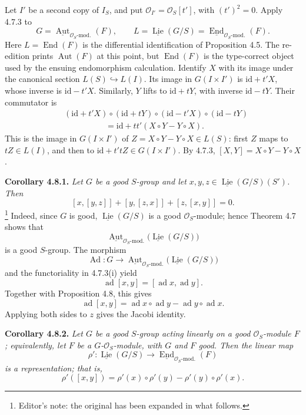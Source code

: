 Let \(I'\) be a second copy of \(I_S\), and put
\(\mathcal O_{I'}=\mathcal O_S[t']\), with \((t')^2=0\). Apply 4.7.3
to
\[
 G=\underline{\operatorname{Aut}}_{\mathcal O_S\text{-mod.}}(F),
 \qquad
 L=\underline{\operatorname{Lie}}(G/S)
  =\underline{\operatorname{End}}_{\mathcal O_S\text{-mod.}}(F).
\]
Here \(L=\operatorname{End}(F)\) is the differential identification of
Proposition 4.5. The re-edition prints \(\operatorname{Aut}(F)\) at
this point, but \(\operatorname{End}(F)\) is the type-correct object
used by the ensuing endomorphism calculation. Identify \(X\) with its image under the
canonical section \(L(S)\hookrightarrow L(I)\). Its image in
\(G(I\times I')\) is \(\mathrm{id}+t'X\), whose inverse is
\(\mathrm{id}-t'X\). Similarly, \(Y\) lifts to
\(\mathrm{id}+tY\), with inverse \(\mathrm{id}-tY\). Their
commutator is
\[
\begin{aligned}
 &(\mathrm{id}+t'X)\circ(\mathrm{id}+tY)
 \circ(\mathrm{id}-t'X)\circ(\mathrm{id}-tY)\\
 &\hspace{5em}
 =\mathrm{id}+tt'(X\circ Y-Y\circ X).
\end{aligned}
\]
This is the image in \(G(I\times I')\) of
\(Z=X\circ Y-Y\circ X\in L(S)\): first \(Z\) maps to
\(tZ\in L(I)\), and then to
\(\mathrm{id}+t'tZ\in G(I\times I')\). By 4.7.3,
\([X,Y]=X\circ Y-Y\circ X\).

\medskip
\noindent\textbf{Corollary 4.8.1.}
\textit{Let \(G\) be a good \(S\)-group and let
\(x,y,z\in\underline{\operatorname{Lie}}(G/S)(S')\). Then}
\[
 [x,[y,z]]+[y,[z,x]]+[z,[x,y]]=0.
\]
\footnote{Editor's note: the original has been expanded in what follows.}
Indeed, since \(G\) is good,
\(\underline{\operatorname{Lie}}(G/S)\) is a good
\(\mathcal O_S\)-module; hence Theorem 4.7 shows that
\[
 \underline{\operatorname{Aut}}_{\mathcal O_S\text{-mod.}}
   \bigl(\underline{\operatorname{Lie}}(G/S)\bigr)
\]
is a good \(S\)-group. The morphism
\[
 \operatorname{Ad}:G\longrightarrow
 \underline{\operatorname{Aut}}_{\mathcal O_S\text{-mod.}}
  \bigl(\underline{\operatorname{Lie}}(G/S)\bigr)
\]
and the functoriality in 4.7.3(i) yield
\[
 \operatorname{ad}[x,y]
 =[\operatorname{ad}x,\operatorname{ad}y].
\]
Together with Proposition 4.8, this gives
\[
 \operatorname{ad}[x,y]
 =\operatorname{ad}x\circ\operatorname{ad}y
  -\operatorname{ad}y\circ\operatorname{ad}x.
\]
Applying both sides to \(z\) gives the Jacobi identity.

\medskip
\noindent\textbf{Corollary 4.8.2.}
\textit{Let \(G\) be a good \(S\)-group acting linearly on a good
\(\mathcal O_S\)-module \(F\); equivalently, let \(F\) be a
\(G\)-\(\mathcal O_S\)-module, with \(G\) and \(F\) good. Then the
linear map}
\[
 \rho':\underline{\operatorname{Lie}}(G/S)
 \longrightarrow
 \underline{\operatorname{End}}_{\mathcal O_S\text{-mod.}}(F)
\]
\textit{is a representation; that is,}
\[
 \rho'([x,y])
 =\rho'(x)\circ\rho'(y)-\rho'(y)\circ\rho'(x).
\]

